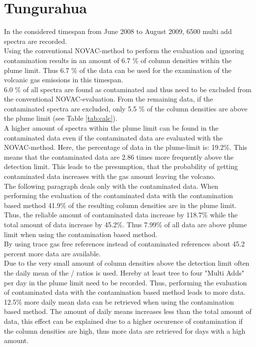 \documentclass  [
  paper    = a4,
  BCOR     = 10mm,
  twoside,
  fontsize = 12pt,
  fleqn,
  toc      = bibnumbered,
  toc      = listofnumbered,
  numbers  = noendperiod,
  headings = normal,
  listof   = leveldown,
  version  = 3.03
]                                       {scrreprt}
\begin{document}
\section{Tungurahua}
	In the considered timespan from June 2008 to August 2009, 6500 multi add spectra are recorded. \\
	Using the conventional NOVAC-method to perform the evaluation and ignoring contamination results in an amount of 6.7 \% of   column densities within the plume limit. Thus 6.7 \% of the data can be used for the examination of the volcanic gas emissions in this timespan.\\
 	6.0 \% of all spectra are found as contaminated and thus need to be excluded from the conventional NOVAC-evaluation. From the remaining data,  if the contaminated spectra are excluded, only 5.5 \% of the   column densities are above the plume limit  (see  Table \ref{tab:calc}). \\
 	A higher amount of spectra within the   plume limit can be found in the contaminated data even if the contaminated data are evaluated with the NOVAC-method. Here, the percentage of data in the plume-limit is: 19.2\%.
 	This means that the contaminated data are 2.86 times more frequently above the detection limit. This leads to the presumption, that the probability of getting contaminated data increases with the gas amount leaving the volcano.\\
 	The following paragraph deals only with the contaminated data.	
 	When performing the evaluation of the contaminated data with the contamination based method 41.9\% of the resulting   column densities are in the plume limit. Thus, the reliable amount of contaminated data increase by 118.7\% while the total amount of data increase by 45.2\%. Thus 7.99\% of all data are above plume limit when using the contamination based method.\\
 	By using trace gas free references instead of contaminated references about 45.2 percent more data are available. \\
 	Due to the very small amount of   column densities above the detection limit often the daily mean of the /  ratios is used. Hereby at least tree to four "Multi Adds" per day in the plume limit need to be recorded. Thus, performing the evaluation of contaminated data with the contamination based method leads to more data.
 	 12.5\% more daily mean data can be retrieved when using the contamination based method. The amount of daily means increases less than the total amount of data, this effect can be explained due to a higher occurence of contamination if the   column densities are high, thus more data are retrieved for days with a high   amount.
\end{document}
